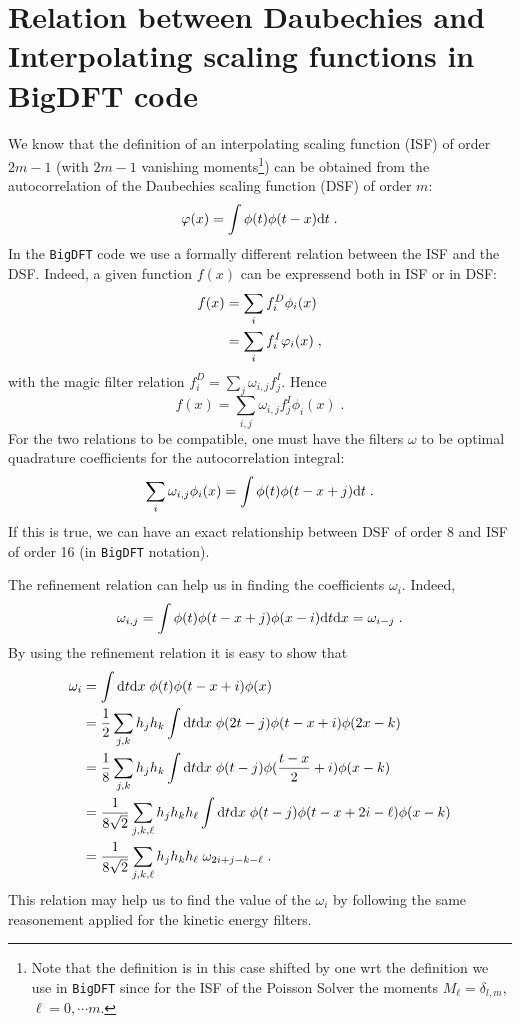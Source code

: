 \documentclass[12pt]{article}
\begin{document}
\section{Relation between Daubechies and Interpolating scaling functions in BigDFT code}
We know that the definition of an interpolating scaling function (ISF) of order $2m-1$ (with $2m-1$ vanishing moments\footnote{Note that the definition is in this case shifted by one wrt the definition we use in {\tt BigDFT} since for the ISF of the Poisson Solver the moments $M_\ell=\delta_{l,m}$, $\ell=0,\cdots m$.}) can be obtained from the autocorrelation of the Daubechies scaling function (DSF) of order $m$:
\begin{equation}
 \varphi(x) =\int \phi(t) \phi(t-x) {\rm d}t\;.
\end{equation}
In the {\tt BigDFT} code we use a formally different relation between the ISF and the DSF.
Indeed, a given function $f(x)$ can be expressend both in ISF or in DSF:
\begin{align}
 f(x)&= \sum_i f^D_i \phi_i(x) \notag \\
 &= \sum_i f^I_i \varphi_i(x)\;,
\end{align}
with the magic filter relation $f^D_i=\sum_j \omega_{i,j} f^I_j$. Hence
\begin{equation}
 f(x)=\sum_{i,j} \omega_{i,j} f^I_j \phi_i(x)\;.
\end{equation}
For the two relations to be compatible, one must have the filters $\omega$ to be optimal quadrature coefficients for the autocorrelation integral:
\begin{equation}
\sum_{i} \omega_{i,j} \phi_i(x) = \int \phi(t) \phi(t-x+j) {\rm d}t\;.
\end{equation}
If this is true, we can have an exact relationship between DSF of order 8 and ISF of order 16 (in {\tt BigDFT} notation).

The refinement relation can help us in finding the coefficients $\omega_i$.
Indeed,
\begin{equation}
 \omega_{i,j} = \int \phi(t) \phi(t-x+j) \phi(x-i) {\rm d}t {\rm d}x = \omega_{i-j}\;.
\end{equation}
By using the refinement relation it is easy to show that
\begin{align}
 \omega_{i}& = \int {\rm d}t {\rm d}x \; \phi(t) \phi(t-x+i) \phi(x) \notag \\
&= \frac{1}{2} \sum_{j,k} h_j h_k \int {\rm d}t {\rm d}x\; \phi(2t-j) \phi(t-x+i) \phi(2x-k) \notag \\
&= \frac{1}{8} \sum_{j,k} h_j h_k \int {\rm d}t {\rm d}x \;\phi(t-j) \phi(\frac{t-x}{2}+i) \phi(x-k) \notag \\
&= \frac{1}{8 \sqrt 2} \sum_{j,k,\ell} h_j h_k h_\ell \int {\rm d}t {\rm d}x\; \phi(t-j) \phi(t-x+2 i-\ell) \phi(x-k)  \\
 &= \frac{1}{8 \sqrt 2} \sum_{j,k,\ell} h_j h_k h_\ell\; \omega_{2i +j -k -\ell} \notag \;.
\end{align}
This relation may help us to find the value of the $\omega_i$ by following the same reasonement applied for the kinetic energy filters.
\end{document}

